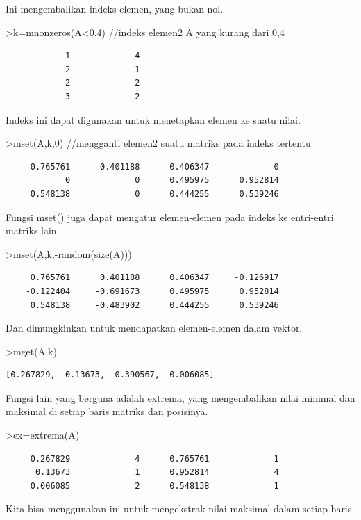 \documentclass[
]{book}
\begin{document}
Ini mengembalikan indeks elemen, yang bukan nol.

\textgreater k=mnonzeros(A\textless0.4) //indeks elemen2 A yang kurang dari 0,4

\begin{verbatim}
            1             4 
            2             1 
            2             2 
            3             2 
\end{verbatim}

Indeks ini dapat digunakan untuk menetapkan elemen ke suatu nilai.

\textgreater mset(A,k,0) //mengganti elemen2 suatu matriks pada indeks tertentu

\begin{verbatim}
     0.765761      0.401188      0.406347             0 
            0             0      0.495975      0.952814 
     0.548138             0      0.444255      0.539246 
\end{verbatim}

Fungsi mset() juga dapat mengatur elemen-elemen pada indeks ke entri-entri matriks lain.

\textgreater mset(A,k,-random(size(A)))

\begin{verbatim}
     0.765761      0.401188      0.406347     -0.126917 
    -0.122404     -0.691673      0.495975      0.952814 
     0.548138     -0.483902      0.444255      0.539246 
\end{verbatim}

Dan dimungkinkan untuk mendapatkan elemen-elemen dalam vektor.

\textgreater mget(A,k)

\begin{verbatim}
[0.267829,  0.13673,  0.390567,  0.006085]
\end{verbatim}

Fungsi lain yang berguna adalah extrema, yang mengembalikan nilai minimal dan maksimal di setiap baris matriks dan posisinya.

\textgreater ex=extrema(A)

\begin{verbatim}
     0.267829             4      0.765761             1 
      0.13673             1      0.952814             4 
     0.006085             2      0.548138             1 
\end{verbatim}

Kita bisa menggunakan ini untuk mengekstrak nilai maksimal dalam setiap baris.
\end{document}
